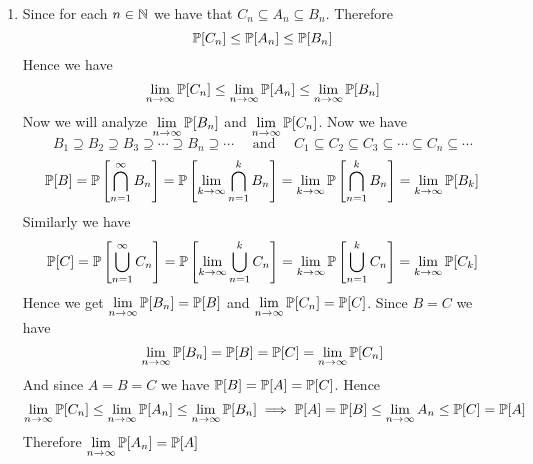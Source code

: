 \documentclass[a4paper, 11pt]{article}
\begin{document}
{\begin{enumerate}[label=(\alph*)]
		\item Since for each $n\in \mathbb{N}$ we have that $C_n\subseteq A_n\subseteq B_n$. Therefore $$\mathbb{P}[C_n]\leq \mathbb{P}[A_n]\leq \mathbb{P}[B_n]$$Hence we have $$\lim_{n\to\infty}\mathbb{P}[C_n]\leq\lim_{n\to\infty}\mathbb{P}[A_n]\leq \lim_{n\to\infty}\mathbb{P}[B_n]$$Now we will analyze $\lim\limits_{n\to\infty}\mathbb{P}[B_n]$ and $\lim\limits_{n\to \infty}\mathbb{P}[C_n]$. Now we have $$B_1\supseteq B_2\supseteq B_3\supseteq \cdots\supseteq B_n\supseteq \cdots\quad\text{ and }\quad C_1\subseteq C_2\subseteq C_3\subseteq \cdots\subseteq C_n\subseteq \cdots$$ \begin{align*}
			\mathbb{P}[B]=\mathbb{P}\left[\bigcap_{n=1}^{\infty}B_n \right]=\mathbb{P}\left[ \lim_{k\to\infty}\bigcap_{n=1}^kB_n \right]=\lim_{k\to\infty}\mathbb{P}\left[ \bigcap_{n=1}^kB_n \right]=\lim_{k\to\infty}\mathbb{P}[B_k]
		\end{align*}Similarly we have \begin{align*}
		\mathbb{P}[C]=\mathbb{P}\left[\bigcup_{n=1}^{\infty}C_n \right]=\mathbb{P}\left[ \lim_{k\to\infty}\bigcup_{n=1}^kC_n \right]=\lim_{k\to\infty}\mathbb{P}\left[ \bigcup_{n=1}^kC_n \right]=\lim_{k\to\infty}\mathbb{P}[C_k]
	\end{align*}Hence we get $\lim\limits_{n\to\infty}\mathbb{P}[B_n]=\mathbb{P}[B]$ and $\lim\limits_{n\to\infty}\mathbb{P}[C_n]=\mathbb{P}[C]$. Since $B=C$ we have $$\lim\limits_{n\to\infty}\mathbb{P}[B_n]=\mathbb{P}[B]=\mathbb{P}[C]=\lim\limits_{n\to\infty}\mathbb{P}[C_n]$$And since $A=B=C$ we have $\mathbb{P}[B]=\mathbb{P}[A]=\mathbb{P}[C]$. Hence $$\lim_{n\to\infty}\mathbb{P}[C_n]\leq\lim_{n\to\infty}\mathbb{P}[A_n]\leq \lim_{n\to\infty}\mathbb{P}[B_n]\implies \mathbb{P}[A]=\mathbb{P}[B]\leq\lim_{n\to\infty}A_n\leq \mathbb{P}[C]=\mathbb{P}[A]$$Therefore $\lim\limits_{n\to\infty}\mathbb{P}[A_n]= \mathbb{P}[A]$
	\end{enumerate}
}

\end{document}
